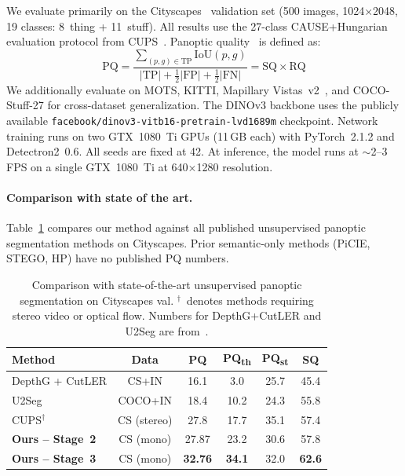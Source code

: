 \documentclass{bmvc2k}
\newcommand{\pqt}{PQ\textsubscript{th}\xspace}
\newcommand{\pqs}{PQ\textsubscript{st}\xspace}
\begin{document}
We evaluate primarily on the Cityscapes~\cite{cordts2016cityscapes} validation set (500 images, 1024$\times$2048, 19 classes: 8~thing + 11~stuff). All results use the 27-class CAUSE+Hungarian evaluation protocol from CUPS~\cite{hahn2025cups}. Panoptic quality~\cite{kirillov2019panoptic} is defined as:
\begin{equation}
\text{PQ} = \frac{\sum_{(p,g)\in\text{TP}} \text{IoU}(p,g)}{|\text{TP}| + \tfrac{1}{2}|\text{FP}| + \tfrac{1}{2}|\text{FN}|} = \text{SQ} \times \text{RQ}
\label{eq:pq}
\end{equation}
We additionally evaluate on MOTS, KITTI, Mapillary Vistas~v2~\cite{neuhold2017mapillary}, and COCO-Stuff-27 for cross-dataset generalization. The DINOv3 backbone uses the publicly available \texttt{facebook/dinov3-vitb16-pretrain-lvd1689m} checkpoint. Network training runs on two GTX~1080~Ti GPUs (11\,GB each) with PyTorch~2.1.2 and Detectron2~0.6. All seeds are fixed at 42. At inference, the model runs at $\sim$2--3 FPS on a single GTX~1080~Ti at 640$\times$1280 resolution.

\paragraph{Comparison with state of the art.}

Table~\ref{tab:sota} compares our method against all published unsupervised panoptic segmentation methods on Cityscapes. Prior semantic-only methods (PiCIE, STEGO, HP) have no published PQ numbers.

\begin{table}[t]
\centering
\caption{Comparison with state-of-the-art unsupervised panoptic segmentation on Cityscapes val. $^\dagger$~denotes methods requiring stereo video or optical flow. Numbers for DepthG+CutLER and U2Seg are from~\cite{hahn2025cups}.}
\label{tab:sota}
\small
\begin{tabular}{@{}lccccc@{}}
\toprule
Method & Data & PQ & \pqt & \pqs & SQ \\
\midrule
DepthG + CutLER & CS+IN & 16.1 & 3.0 & 25.7 & 45.4 \\
U2Seg~\cite{niu2024u2seg} & COCO+IN & 18.4 & 10.2 & 24.3 & 55.8 \\
CUPS$^\dagger$~\cite{hahn2025cups} & CS (stereo) & 27.8 & 17.7 & 35.1 & 57.4 \\
\midrule
\textbf{Ours -- Stage~2} & CS (mono) & 27.87 & 23.2 & 30.6 & 57.8 \\
\textbf{Ours -- Stage~3} & CS (mono) & \textbf{32.76} & \textbf{34.1} & 32.0 & \textbf{62.6} \\
\bottomrule
\end{tabular}
\end{table}
\end{document}
